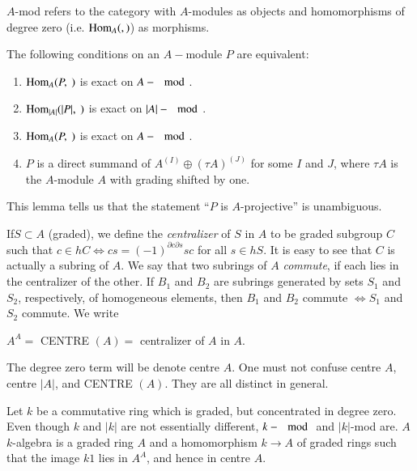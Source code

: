 $A$-mod refers to the category with $A$-modules as objects and
homomorphisms of degree zero (i.e. $ \operatorname{Hom} _A (, )$) as morphisms.  

\begin{lemma}%
The following conditions on an $A-$module $P$ are
equivalent:  
\begin{enumerate}[(1)]
\item $\operatorname{Hom}_A (P, ~)$ is exact on $A-\mod$.

\item $\operatorname{Hom}_{|A|}(|P|, ~)$ is exact on $|A|-\mod$. 

\item $\operatorname{Hom}_A(P, ~)$ is exact on $A-\mod$. 

\item $P$ is a direct summand of $A^{(I)} \oplus (\tau A)^{(J)}$ for
  some $I$ and $J$, where $\tau A$ is the $A$-module $A$ with grading
  shifted by one.  
\end{enumerate}
\end{lemma}

This lemma tells us that the statement ``$P$ is $A$-projective'' is
unambiguous.  

If\pageoriginale $S \subset A$ (graded), we define the
\textit{centralizer} of $S$ 
in $A$ to be graded subgroup $C$ such that $c \in h C \Leftrightarrow
cs = (-1)^{ \partial c \partial s}sc$ for all $s \in h S$. It is
easy to see that $C$ is actually a subring of $A$. We say that two
subrings of $A$ \textit{commute}, if each lies in the centralizer of the
other. If $B_1$ and $B_2$ are subrings generated by sets $S_1$ and
$S_2$, respectively, of homogeneous elements, then $B_1$ and $B_2$
commute $\Leftrightarrow S_1$ and $S_2$ commute. We write  

$A^A =$ CENTRE $(A) =$ centralizer of $A$ in $A$. 

\noindent
The degree zero term will be denote centre $A$. One must not confuse
centre $A$, centre $|A|$, and CENTRE $(A)$. They are all distinct in
general.  

Let $k$ be a commutative ring which is graded, but concentrated in
degree zero. Even though $k$ and $|k|$ are not essentially different,
$k - \mod$ and $|k|$-mod are. $A $ $k$-algebra is a graded ring $A$
and a homomorphism 
$k \to A$ of graded rings such that the image $k 1$ lies in $A^A$, and
hence in centre $A$.  

